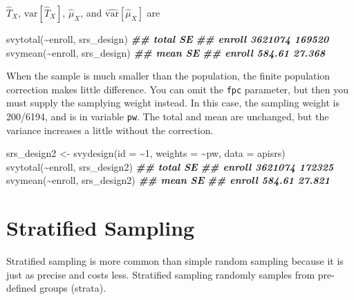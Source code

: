 \documentclass[
]{book}
\newenvironment{Shaded}{\begin{snugshade}}{\end{snugshade}}
\newcommand{\AttributeTok}[1]{\textcolor[rgb]{0.77,0.63,0.00}{#1}}
\newcommand{\DecValTok}[1]{\textcolor[rgb]{0.00,0.00,0.81}{#1}}
\newcommand{\DocumentationTok}[1]{\textcolor[rgb]{0.56,0.35,0.01}{\textbf{\textit{#1}}}}
\newcommand{\FunctionTok}[1]{\textcolor[rgb]{0.00,0.00,0.00}{#1}}
\newcommand{\NormalTok}[1]{#1}
\newcommand{\OtherTok}[1]{\textcolor[rgb]{0.56,0.35,0.01}{#1}}
\newcommand{\SpecialCharTok}[1]{\textcolor[rgb]{0.00,0.00,0.00}{#1}}
\theoremstyle{definition}
\theoremstyle{definition}
\theoremstyle{definition}
\theoremstyle{definition}
\theoremstyle{remark}
\begin{document}
\(\hat{T}_X\), \(\mathrm{var} [\hat{T}_X]\), \(\hat{\mu}_X\), and \(\hat{\mathrm{var}}[\hat{\mu}_X]\) are

\begin{Shaded}
\begin{Highlighting}[]
\FunctionTok{svytotal}\NormalTok{(}\SpecialCharTok{\textasciitilde{}}\NormalTok{enroll, srs\_design)}
\DocumentationTok{\#\#          total     SE}
\DocumentationTok{\#\# enroll 3621074 169520}
\FunctionTok{svymean}\NormalTok{(}\SpecialCharTok{\textasciitilde{}}\NormalTok{enroll, srs\_design)}
\DocumentationTok{\#\#          mean     SE}
\DocumentationTok{\#\# enroll 584.61 27.368}
\end{Highlighting}
\end{Shaded}

When the sample is much smaller than the population, the finite population correction makes little difference. You can omit the \texttt{fpc} parameter, but then you must supply the samplying weight instead. In this case, the sampling weight is 200/6194, and is in variable \texttt{pw}. The total and mean are unchanged, but the variance increases a little without the correction.

\begin{Shaded}
\begin{Highlighting}[]
\NormalTok{srs\_design2 }\OtherTok{\textless{}{-}} \FunctionTok{svydesign}\NormalTok{(}\AttributeTok{id =} \SpecialCharTok{\textasciitilde{}}\DecValTok{1}\NormalTok{, }\AttributeTok{weights =} \SpecialCharTok{\textasciitilde{}}\NormalTok{pw, }\AttributeTok{data =}\NormalTok{ apisrs)}
\FunctionTok{svytotal}\NormalTok{(}\SpecialCharTok{\textasciitilde{}}\NormalTok{enroll, srs\_design2)}
\DocumentationTok{\#\#          total     SE}
\DocumentationTok{\#\# enroll 3621074 172325}
\FunctionTok{svymean}\NormalTok{(}\SpecialCharTok{\textasciitilde{}}\NormalTok{enroll, srs\_design2)}
\DocumentationTok{\#\#          mean     SE}
\DocumentationTok{\#\# enroll 584.61 27.821}
\end{Highlighting}
\end{Shaded}

\hypertarget{stratified}{%
\chapter{Stratified Sampling}\label{stratified}}

Stratified sampling is more common than simple random sampling because it is just as precise and costs less. Stratified sampling randomly samples from pre-defined groups (strata).
\end{document}
